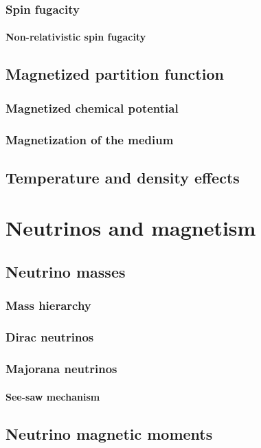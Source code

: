 \documentclass[a4paper]{report}
\begin{document}
        \subsection{Spin fugacity}
            \subsubsection{Non-relativistic spin fugacity}
    \section{Magnetized partition function}
        \subsection{Magnetized chemical potential}
        \subsection{Magnetization of the medium}
    \section{Temperature and density effects}

\chapter{Neutrinos and magnetism}
    \section{Neutrino masses}
        \subsection{Mass hierarchy}
        \subsection{Dirac neutrinos}
        \subsection{Majorana neutrinos}
            \subsubsection{See-saw mechanism}
    \section{Neutrino magnetic moments}
\end{document}
